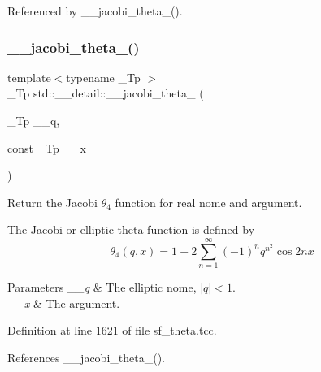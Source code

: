 Referenced by \+\_\+\+\_\+jacobi\+\_\+theta\+\_().

\mbox{\label{namespacestd_1_1____detail_a0e4199a4d77f33d27b09063b25c99b7f}} 
\subsubsection{\texorpdfstring{\+\_\+\+\_\+jacobi\+\_\+theta\+\_()}{\_\_jacobi\_theta\_4()}\hspace{0.1cm}{\footnotesize\ttfamily [2/2]}}
{\footnotesize\ttfamily template$<$typename \+\_\+\+Tp $>$ \\
\+\_\+\+Tp std\+::\+\_\+\+\_\+detail\+::\+\_\+\+\_\+jacobi\+\_\+theta\+\_ (\begin{DoxyParamCaption}\item[{\+\_\+\+Tp}]{\+\_\+\+\_\+q,  }\item[{const \+\_\+\+Tp}]{\+\_\+\+\_\+x }\end{DoxyParamCaption})}

Return the Jacobi $ \theta_4 $ function for real nome and argument.

The Jacobi or elliptic theta function is defined by \[ \theta_4(q,x) = 1 + 2\sum_{n=1}^{\infty}(-1)^n q^{n^2}\cos{2nx} \]


\begin{DoxyParams}{Parameters}
{\em \+\_\+\+\_\+q} & The elliptic nome, $ |q| < 1 $. \\
\hline
{\em \+\_\+\+\_\+x} & The argument. \\
\hline
\end{DoxyParams}


Definition at line 1621 of file sf\+\_\+theta.\+tcc.



References \+\_\+\+\_\+jacobi\+\_\+theta\+\_().

\mbox{\label{namespacestd_1_1____detail_a577345a46215dd84c03eb4c760dbf7f4}} 

